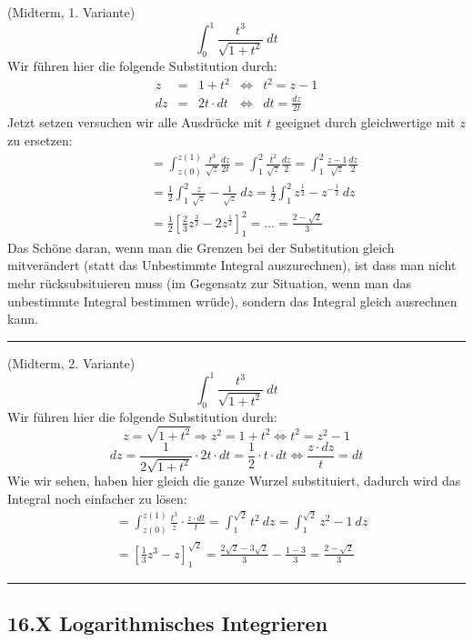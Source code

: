 \documentclass[a4paper,landscape,8pt]{extarticle}
\newcommand{\sep}{\vspace{5pt}\noindent\hrule\vspace{5pt}}
\begin{document}
\begin{multicols*}{4}
\begin{warmup}
\Bsp (Midterm, 1. Variante)
\[
\int_0^1 \frac{t^3}{\sqrt{1+t^2}} \ dt
\]
Wir führen hier die folgende Substitution durch:
\[
\begin{array}{rclcl}
z &= &1+ t^2 & \Longleftrightarrow & t^2 = z-1\\
dz &= &2t \cdot dt & \Longleftrightarrow & dt = \frac{dz}{2t}
\end{array}
\]
Jetzt setzen versuchen wir alle Ausdrücke mit $t$ geeignet durch gleichwertige
mit $z$ zu ersetzen:
\begin{align*}
\qquad &= \int_{z(0)}^{z(1)} \frac{t^3}{\sqrt{z}} \frac{dz}{2t}
= \int_{1}^{2} \frac{t^2}{\sqrt{z}} \frac{dz}{2}
= \int_{1}^{2} \frac{z-1}{\sqrt{z}} \frac{dz}{2}\\
&= \frac{1}{2} \int_{1}^{2} \frac{z}{\sqrt{z}} - \frac{1}{\sqrt{z}} \ dz
= \frac{1}{2} \int_{1}^{2} z^{\frac{1}{2}} - z^{-\frac{1}{2}} \ dz\\
&= \frac{1}{2}\left[\frac{2}{3}z^{\frac{3}{2}} -2z^{\frac{1}{2}}\right]_1^2
= \ldots = \frac{2-\sqrt{2}}{3}
\end{align*}
Das Schöne daran, wenn man die Grenzen bei der Substitution gleich mitverändert
(statt das Unbestimmte Integral auszurechnen), ist dass man nicht mehr
rücksubsituieren muss (im Gegensatz zur Situation, wenn man das unbestimmte
Integral bestimmen wrüde), sondern das Integral gleich ausrechnen kann.

\sep

\Bsp (Midterm, 2. Variante)
\[
\int_0^1 \frac{t^3}{\sqrt{1+t^2}} \ dt
\]
Wir führen hier die folgende Substitution durch:
\[
z = \sqrt{1 + t^2} \Longrightarrow z^2 = 1 + t^2 \Longleftrightarrow t^2 = z^2
-1
\]
\[
dz = \frac{1}{2\sqrt{1+t^2}} \cdot 2t \cdot dt = \frac{1}{2} \cdot t \cdot dt
\Longleftrightarrow \frac{z\cdot dz}{t} = dt
\]
Wie wir sehen, haben hier gleich die ganze Wurzel substituiert, dadurch wird das
Integral noch einfacher zu lösen:
\begin{align*}
&= \int_{z(0)}^{z(1)} \frac{t^3}{z}\cdot \frac{z \cdot dt}{t}
= \int_{1}^{\sqrt{2}}t^2 \ dz
= \int_{1}^{\sqrt{2}}z^2 -1 \ dz\\
&= \left[\frac{1}{3}z^3-z\right]_{1}^{\sqrt{2}}
= \frac{2\sqrt{2}-3\sqrt{2}}{3} - \frac{1-3}{3}
= \frac{2-\sqrt{2}}{3}
\end{align*}

\sep

\end{warmup}


\subsection{16.X Logarithmisches Integrieren}


\end{multicols*}
\end{document}
